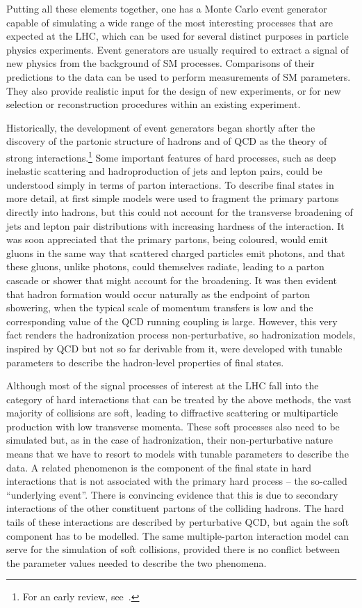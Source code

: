 Putting all
these elements together, one has a Monte Carlo event generator capable
of simulating a wide range of the most interesting processes that are
expected at the LHC, which can be used for several distinct purposes in
particle physics experiments.  Event generators are usually required to extract a
signal of new physics from the background of SM
processes. Comparisons of their predictions to the data can be used to
perform measurements of SM parameters. They also provide realistic
input for the design of new experiments, or for new selection or
reconstruction procedures within an existing experiment. 

Historically, the development of event generators 
began shortly after the discovery of the partonic structure of
hadrons and of QCD as the theory of strong interactions.\footnote{For an early
review, see~\cite{Webber:1986mc}.}  Some important features of hard
  processes, such as deep inelastic scattering and hadroproduction of jets and lepton
  pairs, could be understood simply in terms of parton interactions.
  To describe final states in more detail, at first
simple models were used to fragment the primary partons
directly into hadrons, but this could not account for the transverse
broadening of jets and lepton pair distributions with increasing
hardness of the interaction.  It was soon appreciated that the primary
partons, being coloured, would emit gluons in the same way that
scattered charged particles emit photons, and that these gluons,
unlike photons, could themselves radiate, leading to a parton cascade
or shower that might account for the broadening.  It was then evident
 that hadron formation would occur
naturally as the endpoint of parton showering, when the typical scale
of momentum transfers is low and the corresponding value of the QCD
running coupling is large.  However, this very fact renders the
hadronization process non-perturbative, so hadronization models,
inspired by QCD but not so far derivable from it, were developed with
tunable parameters to describe the hadron-level properties of final states.

Although most of the signal processes of interest at the LHC fall into
the category of hard interactions that can be treated by the above
methods, the vast majority of collisions are soft, leading to
diffractive scattering or multiparticle production with low transverse
momenta.  These soft processes also need to be simulated
but, as in the case of hadronization, their non-perturbative nature
means that we have to resort to models with tunable parameters to
describe the data.  A related phenomenon is the component of the final
state in hard interactions that is not associated with the primary hard process
-- the so-called ``underlying event''.  There is convincing evidence
that this is due to secondary interactions of the other constituent
partons of the colliding hadrons.  The hard tails of these
interactions are described by perturbative QCD, but again the soft
component has to be modelled.  The same multiple-parton interaction
model can serve for the simulation of soft collisions,
provided there is no conflict between the parameter values needed to
describe the two phenomena. 

